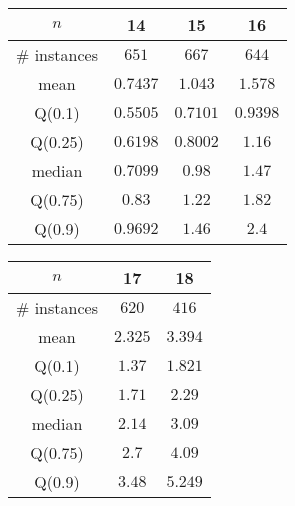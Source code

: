 \begin{tabular}{c|ccc} 
\hline 
$n$ & 14 & 15 & 16 \tabularnewline 
\hline 
\hline 
\# instances & $651$ & $667$ & $644$ \tabularnewline 
mean & $0.7437$ & $1.043$ & $1.578$ \tabularnewline 
Q(0.1) & $0.5505$ & $0.7101$ & $0.9398$ \tabularnewline 
Q(0.25) & $0.6198$ & $0.8002$ & $1.16$ \tabularnewline 
median & $0.7099$ & $0.98$ & $1.47$ \tabularnewline 
Q(0.75) & $0.83$ & $1.22$ & $1.82$ \tabularnewline 
Q(0.9) & $0.9692$ & $1.46$ & $2.4$ \tabularnewline 
\hline 
\end{tabular} 
\medskip{} 

\begin{tabular}{c|cc} 
\hline 
$n$ & 17 & 18 \tabularnewline 
\hline 
\hline 
\# instances & $620$ & $416$ \tabularnewline 
mean & $2.325$ & $3.394$ \tabularnewline 
Q(0.1) & $1.37$ & $1.821$ \tabularnewline 
Q(0.25) & $1.71$ & $2.29$ \tabularnewline 
median & $2.14$ & $3.09$ \tabularnewline 
Q(0.75) & $2.7$ & $4.09$ \tabularnewline 
Q(0.9) & $3.48$ & $5.249$ \tabularnewline 
\hline 
\end{tabular} 
\medskip{} 

